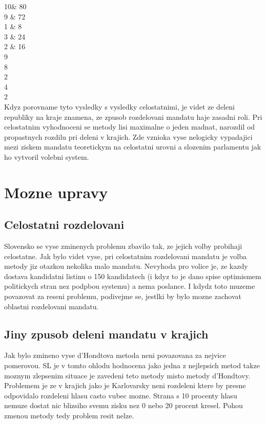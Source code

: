 \documentclass[12pt,a4paper]{article}
\begin{document}
10\& 80 \\
9 \& 72\\
1 \& 8\\
3 \& 24\\
2 \& 16\\

9\\
8\\
2\\
4\\
2\\

Kdyz porovname tyto vysledky s vysledky celostatnimi, je videt ze deleni republiky na kraje znamena, ze zpusob rozdelovani mandatu haje zasadni roli.
Pri celostatnim vyhodnoceni se metody lisi maximalne o jeden madnat, narozdil od propastnych rozdilu pri deleni v krajich.
Zde vznioka vyse nelogicky vypadajici mezi ziskem mandatu teoretickym na celostatni urovni a slozenim parlamentu jak ho vytvoril volebni system.

\section{Mozne upravy}
\subsection{Celostatni rozdelovani}
Slovensko se vyse zminenych problemu zbavilo tak, ze jejich volby probihaji celostatne.
Jak bylo videt vyse, pri celostatnim rozdelovani mandatu je volba metody jiz otazkou nekolika malo mandatu.
Nevyhoda pro volice je, ze kazdy dostava kandidatni listinu o 150 kandidatech (i kdyz to je dano spise optimismem politickych stran nez podpbou systemu) a nema  poslance.
I kdydz toto muzeme povazovat za reseni problemu, podivejme se, jestlki by bylo mozne zachovat oblastni rozdelovani mandatu.
\subsection{Jiny zpusob deleni mandatu v krajich}
Jak bylo zmineno vyse  %
d'Hondtova metoda neni povazovana za nejvice pomerovou.
SL je v tomto ohlodu hodnocena jako jedna z nejlepsich metod %
takze moznym zlepsenim situace je zavedeni teto metody misto metody d'Hondtovy.
Problemem je ze v krajich jako je Karlovarsky neni rozdeleni ktere by presne odpovidalo rozdeleni hlasu casto vubec mozne.
Strana s 10 procenty hlasu nemuze dostat nic blizsiho svemu zisku nez 0 nebo 20 procent kresel.
Pohou zmenou metody tedy problem resit nelze. 
\end{document}
